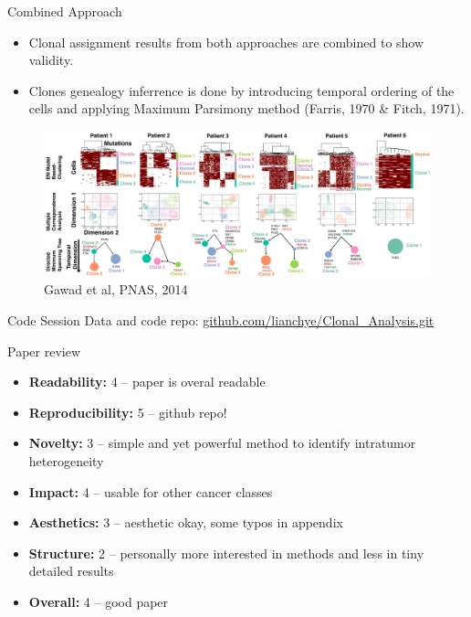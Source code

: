 \documentclass[pdf, aspectratio=169]{beamer}
\begin{document}
\begin{frame}{Combined Approach}

	\begin{itemize}
		\item Clonal assignment results from both approaches are combined to show validity.
		\item Clones genealogy inferrence is done by introducing temporal ordering of the cells and applying Maximum Parsimony method (Farris, 1970 \& Fitch, 1971).
	\end{itemize}
	
	\begin{figure}
		\center
		\includegraphics[scale=.2]{08.png}
		{\tiny Gawad et al, PNAS, 2014}
	\end{figure}
\end{frame}

\begin{frame}{Code Session}
	Data and code repo: \href{http://github.com/lianchye/Clonal_Analysis.git}{github.com/lianchye/Clonal\_Analysis.git}
\end{frame}

\begin{frame}{Paper review}
	\begin{itemize}
		\item \textbf{Readability:} 4 -- paper is overal readable
		\item \textbf{Reproducibility:} 5 -- github repo!
		\item \textbf{Novelty:} 3 -- simple and yet powerful method to identify intratumor heterogeneity
		\item \textbf{Impact:} 4 -- usable for other cancer classes
		\item \textbf{Aesthetics:} 3 -- aesthetic okay, some typos in appendix
		\item \textbf{Structure:} 2 -- personally more interested in methods and less in tiny detailed results
		\item \textbf{Overall:} 4 -- good paper
	\end{itemize}
\end{frame}
\end{document}
